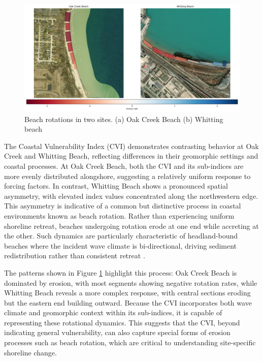 \begin{figure}[htbp]
  \centering
  \includegraphics[width=1\textwidth]{chapter5/resources/sites_rotation.png}
  \caption{Beach rotations in two sites. (a) Oak Creek Beach (b) Whitting beach}
  \label{fig:cites_rotations}
\end{figure}

The Coastal Vulnerability Index (CVI) demonstrates contrasting behavior at Oak
Creek and Whitting Beach, reflecting differences in their geomorphic settings
and coastal processes. At Oak Creek Beach, both the CVI and its sub-indices are
more evenly distributed alongshore, suggesting a relatively uniform response to
forcing factors. In contrast, Whitting Beach shows a pronounced spatial
asymmetry, with elevated index values concentrated along the northwestern edge.
This asymmetry is indicative of a common but distinctive process in coastal
environments known as beach rotation. Rather than experiencing uniform shoreline
retreat, beaches undergoing rotation erode at one end while accreting at the
other. Such dynamics are particularly characteristic of headland-bound beaches
where the incident wave climate is bi-directional, driving sediment
redistribution rather than consistent retreat
\citep{wiggins_regionally-coherent_2019}.

The patterns shown in Figure \ref{fig:cites_rotations} highlight this process:
Oak Creek Beach is dominated by erosion, with most segments showing negative
rotation rates, while Whitting Beach reveals a more complex response, with
central sections eroding but the eastern end building outward. Because the CVI
incorporates both wave climate and geomorphic context within its sub-indices, it
is capable of representing these rotational dynamics. This suggests that the
CVI, beyond indicating general vulnerability, can also capture special forms of
erosion processes such as beach rotation, which are critical to understanding
site-specific shoreline change.

